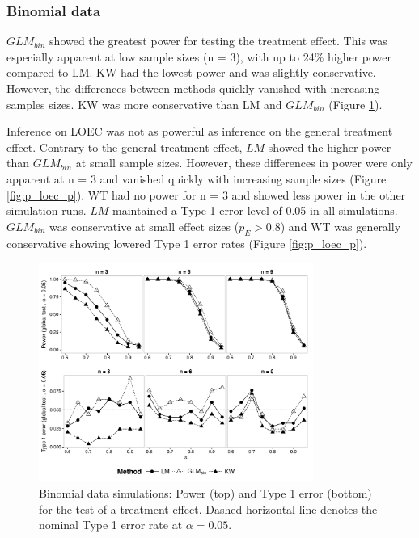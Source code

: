\documentclass{scrartcl}
\begin{document}
\subsubsection{Binomial data}
$GLM_{bin}$ showed the greatest power for testing the treatment effect. 
This was especially apparent at low sample sizes (n = 3), with up to 24\% higher power compared to LM.
KW had the lowest power and was slightly conservative.
However, the differences between methods quickly vanished with increasing samples sizes. 
KW was more conservative than LM and $GLM_{bin}$ (Figure \ref{fig:p_glob_p}).

Inference on LOEC was not as powerful as inference on the general treatment effect.
Contrary to the general treatment effect, $LM$ showed the higher power than $GLM_{bin}$ at small sample sizes.
However, these differences in power were only apparent at n = 3 and vanished quickly with increasing sample sizes (Figure \ref{fig:p_loec_p}). 
WT had no power for n = 3 and showed less power in the other simulation runs.
$LM$ maintained a Type 1 error level of 0.05 in all simulations. 
$GLM_{bin}$ was conservative at small effect sizes ($p_E > 0.8$) and WT was generally conservative showing lowered Type 1 error rates (Figure \ref{fig:p_loec_p}).

\begin{figure}
  \centering
  \includegraphics[width = 0.8\textwidth]{p_glob_p.pdf}
  \caption{
  Binomial data simulations: 
  Power (top) and Type 1 error (bottom) for the test of a treatment effect. 
  Dashed horizontal line denotes the nominal Type 1 error rate at $\alpha = 0.05$.
  }
  \label{fig:p_glob_p}
\end{figure}
\end{document}
